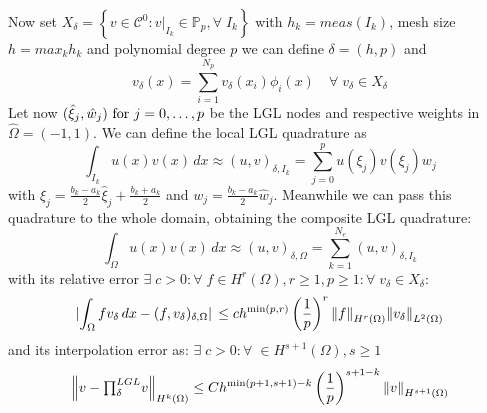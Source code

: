 Now set \(X_\delta = \left\{ v \in \mathcal{C}^0 : v\vert_{I_k} \in \mathbb{P}_p, \forall \; I_k \right\}\) with \(h_k = meas(I_k)\), mesh size \(h =  max_k h_k\) and polynomial degree \(p\) we can define \(\delta = (h,p)\) and 
\[
    v_\delta(x) = \sum_{i=1}^{N_p} v_\delta (x_i)\phi_i(x) \quad \forall \; v_\delta \in X_\delta
\]
Let now \((\hat{\xi}_j, \hat{w}_j) \text{ for } j = 0, \ldots, p\) be the LGL nodes and respective weights in \(\hat{\Omega} = (-1,1)\).
We can define the local LGL quadrature as
\[
    \int_{I_k} u(x)v(x) \, dx \approx (u,v)_{\delta, I_k} = \sum_{j=0}^{p} u(\xi_j)v(\xi_j)w_j
\]
with \(\xi_j = \frac{b_k - a_k}{2}\hat{\xi}_j + \frac{b_k + a_k}{2}\) and \(w_j = \frac{b_k -a_k}{2}\hat{w}_j\).
Meanwhile we can pass this quadrature to the whole domain, obtaining the composite LGL quadrature:
\[
    \int_\Omega u(x)v(x)\, dx \approx (u,v)_{\delta, \Omega} = \sum_{k=1}^{N_e} (u,v)_{\delta, I_k}
\]
with its relative error \(\exists \; c > 0 : \forall \; f \in H^r(\Omega), r\geq 1, p \geq 1 : \forall \; v_\delta \in X_\delta \):
\[
    \abs*{\int_{\Omega} fv_\delta \, dx - (f, v_\delta)_{\delta, \Omega}} \leq c h^{\min(p,r)}\left( \frac{1}{p} \right)^r \norm{f}_{H^r(\Omega)}\norm{v_\delta}_{L^2(\Omega)}
\]
and its interpolation error as: \(\exists \; c > 0 : \forall \;\in H^{s+1}(\Omega), s \geq 1\)
\[
    \norm{v - {\textstyle \prod_{\delta}^{LGL}}v}_{H^k(\Omega)} \leq Ch^{\min(p+1, s+1)-k}\left( \frac{1}{p} \right)^{s+1-k}\norm{v}_{H^{s+1}(\Omega)}
\] 
